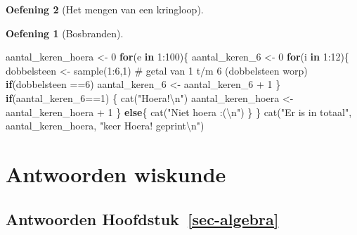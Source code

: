 \documentclass[
  a4paper,
]{scrbook}
\newenvironment{Shaded}{\begin{snugshade}}{\end{snugshade}}
\newcommand{\CommentTok}[1]{\textcolor[rgb]{0.37,0.37,0.37}{#1}}
\newcommand{\ControlFlowTok}[1]{\textcolor[rgb]{0.00,0.23,0.31}{\textbf{#1}}}
\newcommand{\DecValTok}[1]{\textcolor[rgb]{0.68,0.00,0.00}{#1}}
\newcommand{\FunctionTok}[1]{\textcolor[rgb]{0.28,0.35,0.67}{#1}}
\newcommand{\NormalTok}[1]{\textcolor[rgb]{0.00,0.23,0.31}{#1}}
\newcommand{\OtherTok}[1]{\textcolor[rgb]{0.00,0.23,0.31}{#1}}
\newcommand{\SpecialCharTok}[1]{\textcolor[rgb]{0.37,0.37,0.37}{#1}}
\newcommand{\StringTok}[1]{\textcolor[rgb]{0.13,0.47,0.30}{#1}}
\theoremstyle{definition}
\newtheorem{exercise}{Oefening}[chapter]
\theoremstyle{remark}
\begin{document}
\begin{exercise}[Het mengen van een
kringloop]
\begin{exercise}[Bosbranden]
\begin{Shaded}
\begin{Highlighting}[]
\NormalTok{aantal\_keren\_hoera }\OtherTok{\textless{}{-}} \DecValTok{0}
\ControlFlowTok{for}\NormalTok{(e }\ControlFlowTok{in} \DecValTok{1}\SpecialCharTok{:}\DecValTok{100}\NormalTok{)\{}
\NormalTok{  aantal\_keren\_6 }\OtherTok{\textless{}{-}} \DecValTok{0}
  \ControlFlowTok{for}\NormalTok{(i }\ControlFlowTok{in} \DecValTok{1}\SpecialCharTok{:}\DecValTok{12}\NormalTok{)\{}
\NormalTok{    dobbelsteen }\OtherTok{\textless{}{-}} \FunctionTok{sample}\NormalTok{(}\DecValTok{1}\SpecialCharTok{:}\DecValTok{6}\NormalTok{,}\DecValTok{1}\NormalTok{) }\CommentTok{\# getal van 1 t/m 6 (dobbelsteen worp)}
    \ControlFlowTok{if}\NormalTok{(dobbelsteen }\SpecialCharTok{==}\DecValTok{6}\NormalTok{) aantal\_keren\_6 }\OtherTok{\textless{}{-}}\NormalTok{ aantal\_keren\_6 }\SpecialCharTok{+} \DecValTok{1}
\NormalTok{  \}}
  \ControlFlowTok{if}\NormalTok{(aantal\_keren\_6}\SpecialCharTok{==}\DecValTok{1}\NormalTok{) \{}
    \FunctionTok{cat}\NormalTok{(}\StringTok{"Hoera!}\SpecialCharTok{\textbackslash{}n}\StringTok{"}\NormalTok{)}
\NormalTok{    aantal\_keren\_hoera }\OtherTok{\textless{}{-}}\NormalTok{ aantal\_keren\_hoera }\SpecialCharTok{+} \DecValTok{1}
\NormalTok{  \}}
  \ControlFlowTok{else}\NormalTok{\{}
    \FunctionTok{cat}\NormalTok{(}\StringTok{"Niet hoera :(}\SpecialCharTok{\textbackslash{}n}\StringTok{"}\NormalTok{)}
\NormalTok{  \}}
\NormalTok{\}}
\FunctionTok{cat}\NormalTok{(}\StringTok{"Er is in totaal"}\NormalTok{, aantal\_keren\_hoera, }\StringTok{"keer \textquotesingle{}Hoera!\textquotesingle{} geprint}\SpecialCharTok{\textbackslash{}n}\StringTok{"}\NormalTok{)}
\end{Highlighting}
\end{Shaded}

\chapter*{Antwoorden wiskunde}\label{antwoorden-wiskunde}


\section*{\texorpdfstring{Antwoorden
Hoofdstuk~\ref{sec-algebra}}{Antwoorden Hoofdstuk~}}\label{antwoorden-sec-algebra}


\end{exercise}
\end{exercise}
\end{document}
